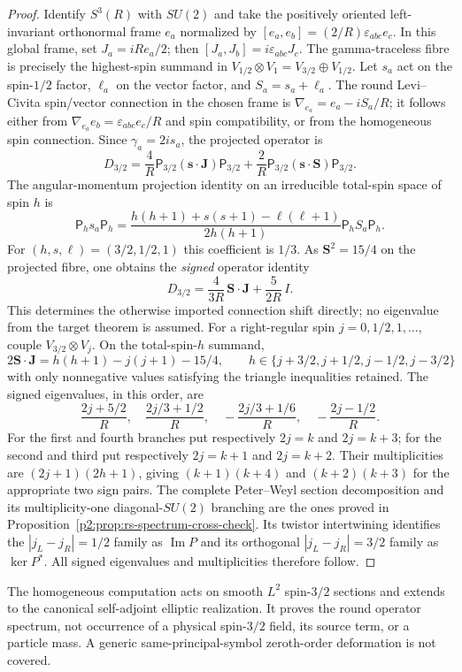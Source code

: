 \documentclass[11pt,a4paper]{article}
\begin{document}
\begin{proof}
Identify $S^3(R)$ with $SU(2)$ and take the positively oriented
left-invariant orthonormal frame $e_a$ normalized by
$[e_a,e_b]=(2/R)\varepsilon_{abc}e_c$.
In this global frame, set $J_a=iRe_a/2$; then
$[J_a,J_b]=i\varepsilon_{abc}J_c$.
The gamma-traceless fibre is precisely the highest-spin summand in
$V_{1/2}\otimes V_1=V_{3/2}\oplus V_{1/2}$.
Let $s_a$ act on the spin-$1/2$ factor, $\ell_a$ on the vector factor,
and $S_a=s_a+\ell_a$.
The round Levi--Civita spin/vector connection in the chosen frame is
$\nabla_{e_a}=e_a-iS_a/R$; it follows either from
$\nabla_{e_a}e_b=\varepsilon_{abc}e_c/R$ and spin compatibility, or
from the homogeneous spin connection.
Since $\gamma_a=2is_a$, the projected operator is
\[
 D_{3/2}=\frac4R\mathsf P_{3/2}(\mathbf s\cdot\mathbf J)
                         \mathsf P_{3/2}
          +\frac2R\mathsf P_{3/2}(\mathbf s\cdot\mathbf S)
                         \mathsf P_{3/2}.
\]
The angular-momentum projection identity on an irreducible total-spin
space of spin $h$ is
\[
 \mathsf P_h s_a\mathsf P_h
 =\frac{h(h+1)+s(s+1)-\ell(\ell+1)}{2h(h+1)}
   \mathsf P_h S_a\mathsf P_h.
\]
For $(h,s,\ell)=(3/2,1/2,1)$ this coefficient is $1/3$.
As $\mathbf S^2=15/4$ on the projected fibre, one obtains the
\emph{signed} operator identity
\begin{equation}
\label{p2f:eq:v260-rs-round-operator}
\boxed{D_{3/2}=\frac{4}{3R}\,\mathbf S\cdot\mathbf J
                   +\frac{5}{2R}\,I.}
\end{equation}
This determines the otherwise imported connection shift directly;
no eigenvalue from the target theorem is assumed.
For a right-regular spin $j=0,1/2,1,\ldots$, couple $V_{3/2}\otimes V_j$.
On the total-spin-$h$ summand,
\[
 2\mathbf S\cdot\mathbf J
  =h(h+1)-j(j+1)-15/4,
 \qquad h\in\{j+3/2,j+1/2,j-1/2,j-3/2\}
\]
with only nonnegative values satisfying the triangle inequalities retained.
The signed eigenvalues, in this order, are
\[
 \frac{2j+5/2}{R},\quad
 \frac{2j/3+1/2}{R},\quad
 -\frac{2j/3+1/6}{R},\quad
 -\frac{2j-1/2}{R}.
\]
For the first and fourth branches put respectively $2j=k$ and
$2j=k+3$; for the second and third put respectively
$2j=k+1$ and $2j=k+2$. Their multiplicities are
$(2j+1)(2h+1)$, giving $(k+1)(k+4)$ and $(k+2)(k+3)$
for the appropriate two sign pairs. The complete Peter--Weyl
section decomposition and its multiplicity-one diagonal-$SU(2)$
branching are the ones proved in
Proposition~\ref{p2:prop:rs-spectrum-cross-check}.
Its twistor intertwining identifies the $|j_L-j_R|=1/2$ family as
$\operatorname{Im}P$ and its orthogonal $|j_L-j_R|=3/2$ family as
$\ker P^*$. All signed eigenvalues and multiplicities therefore follow.
\end{proof}
\begin{remark}
The homogeneous computation acts on smooth $L^2$ spin-$3/2$ sections
and extends to the canonical self-adjoint elliptic realization.
It proves the round operator spectrum, not occurrence of a physical
spin-$3/2$ field, its source term, or a particle mass. A generic
same-principal-symbol zeroth-order deformation is not covered.
\end{remark}
\end{document}
